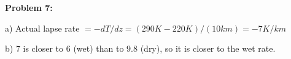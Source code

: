 \documentclass[10pt]{article}
\begin{document}
\begin{flushleft}
\hrulefill


        \textbf{Problem 7:}

        a) Actual lapse rate $=-dT/dz=(290K-220K)/(10km)=-7K/km$

        b) 7 is closer to 6 (wet) than to 9.8 (dry), so it is closer to the wet rate.






        

    \end{flushleft}

 
\end{document}
